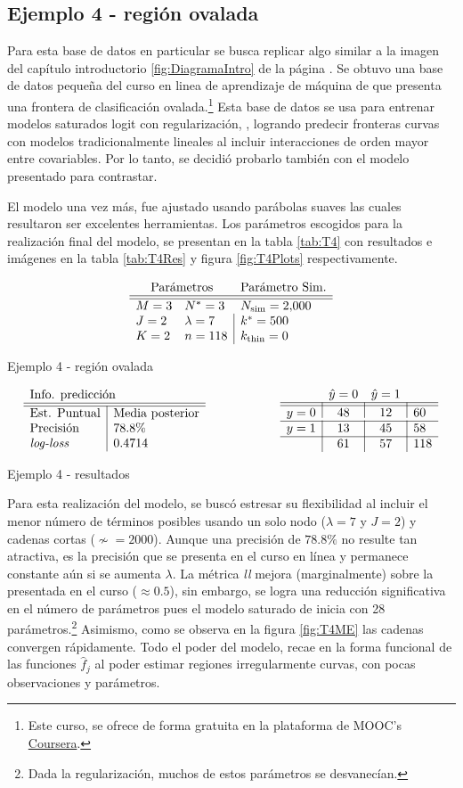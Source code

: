 \documentclass[../Main/Main.tex]{subfiles}
\begin{document}
\subsection*{Ejemplo 4 - región ovalada}
Para esta base de datos en particular se busca replicar algo similar a la imagen del capítulo introductorio \ref{fig:DiagramaIntro} de la página \pageref{fig:DiagramaIntro}. Se obtuvo una base de datos pequeña del curso en linea de aprendizaje de máquina de \citet{andrew2018ml} que presenta una frontera de clasificación ovalada.\footnote{Este curso, se ofrece de forma gratuita en la plataforma de MOOC's \href{https://www.coursera.org/learn/machine-learning}{Coursera}.} Esta base de datos se usa para entrenar modelos saturados logit con regularización, \citet{hastie2008elements}, logrando predecir fronteras curvas con modelos tradicionalmente lineales al incluir interacciones de orden mayor entre covariables. Por lo tanto, se decidió probarlo también con el modelo presentado para contrastar.

El modelo una vez más, fue ajustado usando parábolas suaves las cuales resultaron ser excelentes herramientas. Los parámetros escogidos para la realización final del modelo, se presentan en la tabla \ref{tab:T4} con resultados e imágenes en la tabla \ref{tab:T4Res} y figura \ref{fig:T4Plots} respectivamente.  
\begin{table}[h]
$$\paramsmod{3}{2}{2}{3}{7}{118}{\num{2000}}{500}{0}$$
\caption{Ejemplo 4 - región ovalada}
\label{tab:T4}
\end{table}

\begin{table}[h]
\begin{align*}
\resultados{\text{Media posterior}}{78.8}{0.4714}
\qquad\qquad\qquad
\matconf{48}{12}{60}{13}{45}{58}{61}{57}{118}
\end{align*}
\caption{Ejemplo 4 - resultados}
\label{tab:T4Res}
\end{table}

Para esta realización del modelo, se buscó estresar su flexibilidad al incluir el menor número de términos posibles usando un solo nodo ($\lambda = 7$ y $J = 2$) y cadenas cortas ($\nsim = \num{2000}$). Aunque una precisión de $78.8\%$ no resulte tan atractiva, es la precisión que se presenta en el curso en línea y permanece constante aún si se aumenta $\lambda$. La métrica \textit{ll} mejora (marginalmente) sobre la presentada en el curso ($\approx0.5$), sin embargo, se logra una reducción significativa en el número de parámetros pues el modelo saturado de \citet{andrew2018ml} inicia con 28 parámetros.\footnote{Dada la regularización, muchos de estos parámetros se desvanecían.} Asimismo, como se observa en la figura \ref{fig:T4ME} las cadenas convergen rápidamente. Todo el poder del modelo, recae en la forma funcional de las funciones $\hat{f}_j$ al poder estimar regiones irregularmente curvas, con pocas observaciones y parámetros. 
\end{document}
